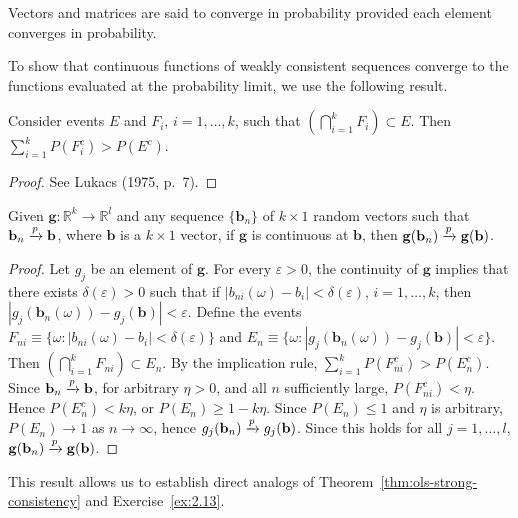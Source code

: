 Vectors and matrices are said to converge in probability provided each
element converges in probability.

To show that continuous functions of weakly consistent sequences converge to the functions evaluated at the probability limit, we use the following result.

\begin{proposition}\label{prop:implication-rule}
Consider events $E$ and $F_i$,
$i = 1, \ldots, k$, such that $\left(\bigcap_{i=1}^k F_i\right) \subset E$. Then $\sum_{i=1}^k P(F_i^c) > P(E^c)$.
\end{proposition}

\begin{proof}
See Lukacs (1975, p.\ 7).
\end{proof}

\begin{proposition}\label{prop:cmt-p}
Given $\mathbf{g} : \mathbb{R}^k \to \mathbb{R}^l$ and any sequence $\{\mathbf{b}_n\}$ of $k \times 1$
random vectors such that $\mathbf{b}_n \xrightarrow{p} \mathbf{b}$, where $\mathbf{b}$ is a $k \times 1$ vector, if $\mathbf{g}$ is
continuous at $\mathbf{b}$, then $\mathbf{g}(\mathbf{b}_n) \xrightarrow{p} \mathbf{g}(\mathbf{b})$.
\end{proposition}

\begin{proof}
Let $g_j$ be an element of $\mathbf{g}$. For every $\varepsilon > 0$, the continuity of
$\mathbf{g}$ implies that there exists $\delta(\varepsilon) > 0$ such that if $|b_{ni}(\omega) - b_i| < \delta(\varepsilon)$,
$i = 1, \ldots, k$, then $|g_j(\mathbf{b}_n(\omega)) - g_j(\mathbf{b})| < \varepsilon$. Define the events $F_{ni} \equiv \{\omega :
|b_{ni}(\omega) - b_i| < \delta(\varepsilon)\}$ and $E_n \equiv \{\omega : |g_j(\mathbf{b}_n(\omega)) - g_j(\mathbf{b})| < \varepsilon\}$. Then
$\left(\bigcap_{i=1}^k F_{ni}\right) \subset E_n$. By the implication
rule, $\sum_{i=1}^k P(F_{ni}^c) > P(E_n^c)$. Since
$\mathbf{b}_n \xrightarrow{p} \mathbf{b}$, for arbitrary $\eta > 0$, and all $n$ sufficiently large, $P(F_{ni}^c) < \eta$.
Hence $P(E_n^c) < k\eta$, or $P(E_n) \geq 1 - k\eta$. Since $P(E_n) \leq 1$ and $\eta$ is arbitrary,
$P(E_n) \to 1$ as $n \to \infty$, hence $g_j(\mathbf{b}_n) \xrightarrow{p} g_j(\mathbf{b})$. Since this holds for all
$j = 1, \ldots, l$, $\mathbf{g}(\mathbf{b}_n) \xrightarrow{p} \mathbf{g}(\mathbf{b})$.
\end{proof}

This result allows us to establish direct analogs of Theorem~\ref{thm:ols-strong-consistency} and
Exercise~\ref{ex:2.13}.

